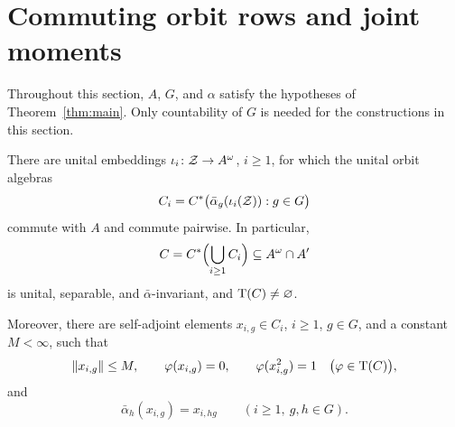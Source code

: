 \section{Commuting orbit rows and joint moments}
\label{sec:rows}

Throughout this section, \(A\), \(G\), and \(\alpha\) satisfy the
hypotheses of Theorem~\ref{thm:main}. Only countability of \(G\) is
needed for the constructions in this section.

\begin{proposition}
\label{prop:rows}
There are unital embeddings
\(\iota_i\colon\mathcal Z\to A^\omega\), \(i\geq 1\), for which the unital
orbit algebras
\[
 C_i=C^*\bigl(\bar\alpha_g(\iota_i(\mathcal Z)):g\in G\bigr)
\]
commute with \(A\) and commute pairwise. In particular,
\[
 C=C^*\Bigl(\bigcup_{i\geq 1}C_i\Bigr)
 \subseteq A^\omega\cap A'
\]
is unital, separable, and \(\bar\alpha\)-invariant, and
\(\operatorname{T}(C)\neq\varnothing\).

Moreover, there are self-adjoint elements \(x_{i,g}\in C_i\),
\(i\geq 1\), \(g\in G\), and a constant \(M<\infty\), such that
\begin{equation}
\label{eq:row-normalization}
 \|x_{i,g}\|\leq M,\qquad
 \varphi(x_{i,g})=0,\qquad
 \varphi(x_{i,g}^2)=1
 \quad\bigl(\varphi\in\operatorname{T}(C)\bigr),
\end{equation}
and
\begin{equation}
\label{eq:row-equivariance}
 \bar\alpha_h(x_{i,g})=x_{i,hg}
 \qquad(i\geq1,\ g,h\in G).
\end{equation}
\end{proposition}

